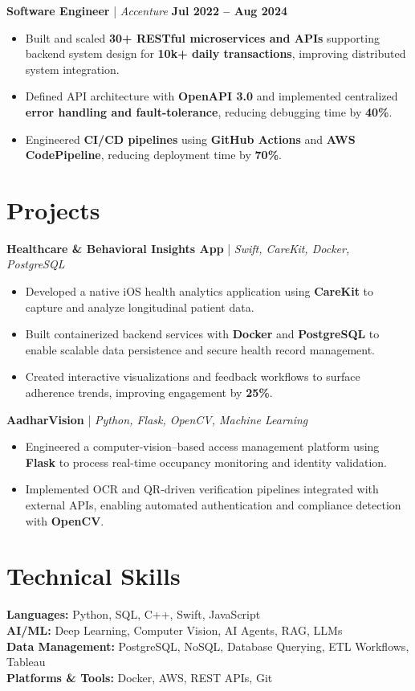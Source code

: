 \documentclass[letterpaper,11pt]{article}
\begin{document}
\textbf{Software Engineer} \;|\; \textit{Accenture} \hfill \textbf{Jul 2022 -- Aug 2024} \\
\begin{itemize}[noitemsep]
    \item Built and scaled \textbf{30+ RESTful microservices and APIs} supporting backend system design for \textbf{10k+ daily transactions}, improving distributed system integration.
    \item Defined API architecture with \textbf{OpenAPI 3.0} and implemented centralized \textbf{error handling and fault-tolerance}, reducing debugging time by \textbf{40\%}.
    \item Engineered \textbf{CI/CD pipelines} using \textbf{GitHub Actions} and \textbf{AWS CodePipeline}, reducing deployment time by \textbf{70\%}.
\end{itemize}

\section*{Projects}
\textbf{Healthcare \& Behavioral Insights App} \;|\; \textit{Swift, CareKit, Docker, PostgreSQL} \\
\begin{itemize}[noitemsep]
    \item Developed a native iOS health analytics application using \textbf{CareKit} to capture and analyze longitudinal patient data.
    \item Built containerized backend services with \textbf{Docker} and \textbf{PostgreSQL} to enable scalable data persistence and secure health record management.
    \item Created interactive visualizations and feedback workflows to surface adherence trends, improving engagement by \textbf{25\%}.
\end{itemize}

\textbf{AadharVision} \;|\; \textit{Python, Flask, OpenCV, Machine Learning} \\
\begin{itemize}[noitemsep]
    \item Engineered a computer-vision–based access management platform using \textbf{Flask} to process real-time occupancy monitoring and identity validation.
    \item Implemented OCR and QR-driven verification pipelines integrated with external APIs, enabling automated authentication and compliance detection with \textbf{OpenCV}.
\end{itemize}

\section*{Technical Skills}
\textbf{Languages:} Python, SQL, C++, Swift, JavaScript \\
\textbf{AI/ML:} Deep Learning, Computer Vision, AI Agents, RAG, LLMs \\
\textbf{Data Management:} PostgreSQL, NoSQL, Database Querying, ETL Workflows, Tableau \\
\textbf{Platforms \& Tools:} Docker, AWS, REST APIs, Git
\end{document}
